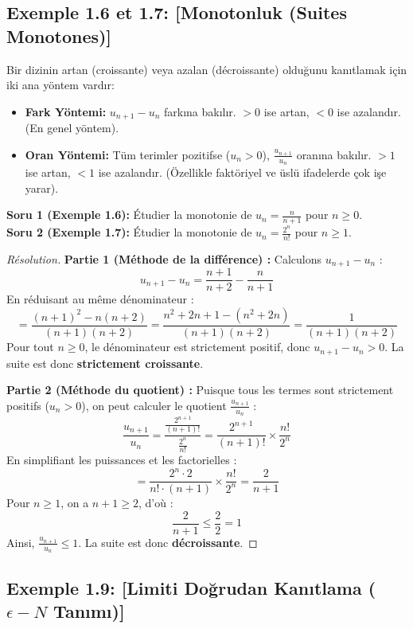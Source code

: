 \documentclass[12pt,a4paper]{report}
\begin{document}
\subsection*{Exemple 1.6 et 1.7: [Monotonluk (Suites Monotones)]}

\begin{tcolorbox}[colback=green!5!white,colframe=green!60!black,title=Hatırlatma (Rappel): Monotonluk Testleri]
Bir dizinin artan (croissante) veya azalan (décroissante) olduğunu kanıtlamak için iki ana yöntem vardır:
\begin{itemize}
    \item \textbf{Fark Yöntemi:} $u_{n+1} - u_n$ farkına bakılır. $>0$ ise artan, $<0$ ise azalandır. (En genel yöntem).
    \item \textbf{Oran Yöntemi:} Tüm terimler pozitifse ($u_n > 0$), $\frac{u_{n+1}}{u_n}$ oranına bakılır. $>1$ ise artan, $<1$ ise azalandır. (Özellikle faktöriyel ve üslü ifadelerde çok işe yarar).
\end{itemize}
\end{tcolorbox}

\textbf{Soru 1 (Exemple 1.6):} Étudier la monotonie de $u_n = \frac{n}{n+1}$ pour $n \ge 0$.\\
\textbf{Soru 2 (Exemple 1.7):} Étudier la monotonie de $u_n = \frac{2^n}{n!}$ pour $n \ge 1$.

\begin{proof}[Résolution]
\textbf{Partie 1 (Méthode de la différence) :}
Calculons $u_{n+1} - u_n$ :
\[ u_{n+1} - u_n = \frac{n+1}{n+2} - \frac{n}{n+1} \]
En réduisant au même dénominateur :
\[ = \frac{(n+1)^2 - n(n+2)}{(n+1)(n+2)} = \frac{n^2+2n+1 - (n^2+2n)}{(n+1)(n+2)} = \frac{1}{(n+1)(n+2)} \]
Pour tout $n \ge 0$, le dénominateur est strictement positif, donc $u_{n+1} - u_n > 0$.
La suite est donc \textbf{strictement croissante}.

\textbf{Partie 2 (Méthode du quotient) :}
Puisque tous les termes sont strictement positifs ($u_n > 0$), on peut calculer le quotient $\frac{u_{n+1}}{u_n}$ :
\[ \frac{u_{n+1}}{u_n} = \frac{\frac{2^{n+1}}{(n+1)!}}{\frac{2^n}{n!}} = \frac{2^{n+1}}{(n+1)!} \times \frac{n!}{2^n} \]
En simplifiant les puissances et les factorielles :
\[ = \frac{2^n \cdot 2}{n! \cdot (n+1)} \times \frac{n!}{2^n} = \frac{2}{n+1} \]
Pour $n \ge 1$, on a $n+1 \ge 2$, d'où :
\[ \frac{2}{n+1} \le \frac{2}{2} = 1 \]
Ainsi, $\frac{u_{n+1}}{u_n} \le 1$. La suite est donc \textbf{décroissante}.
\end{proof}

\subsection*{Exemple 1.9: [Limiti Doğrudan Kanıtlama ($\epsilon - N$ Tanımı)]}
\end{document}

